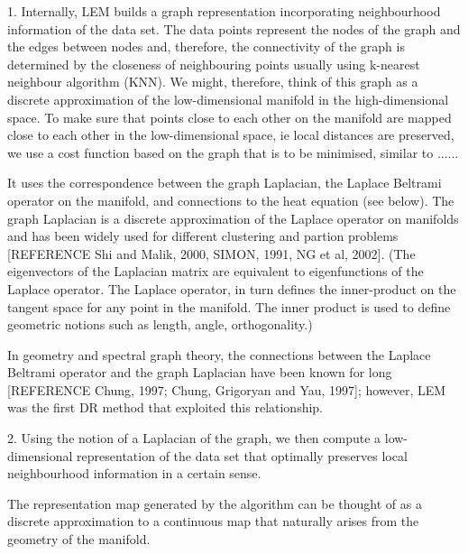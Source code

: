

1. Internally, LEM builds a graph representation incorporating neighbourhood information of the data set. The data points represent the nodes of the graph and the edges between nodes and, therefore, the connectivity of the graph is determined by the closeness of neighbouring points usually using k-nearest neighbour algorithm (KNN). We might, therefore, think of this graph as a discrete approximation of the low-dimensional manifold in the high-dimensional space. 
To make sure that points close to each other on the manifold are mapped close to each other in the low-dimensional space, ie local distances are preserved, we use a cost function based on the graph that is to be minimised, similar to ......

It uses the correspondence between the graph Laplacian, the Laplace Beltrami operator on the manifold, and connections to the heat equation (see below). The graph Laplacian is a discrete approximation of the Laplace operator on manifolds and has been widely used for different clustering and partion problems [REFERENCE Shi and Malik, 2000, SIMON, 1991, NG et al, 2002]. (The eigenvectors of the Laplacian matrix are equivalent to eigenfunctions of the Laplace operator. The Laplace operator, in turn defines the inner-product on the tangent space for any point in the manifold. The inner product is used to define geometric notions such as length, angle, orthogonality.)

In geometry and spectral graph theory, the connections between the Laplace Beltrami operator and the graph Laplacian have been known for long [REFERENCE Chung, 1997; Chung, Grigoryan and Yau, 1997]; however, LEM was the first DR method that exploited this relationship. 

2. Using the notion of a Laplacian of the graph, we then compute a low-dimensional representation of the data set that optimally preserves local neighbourhood information in a certain sense.

The representation map generated by the algorithm can be thought of as a discrete approximation to a continuous map that naturally arises from the geometry of the manifold.


